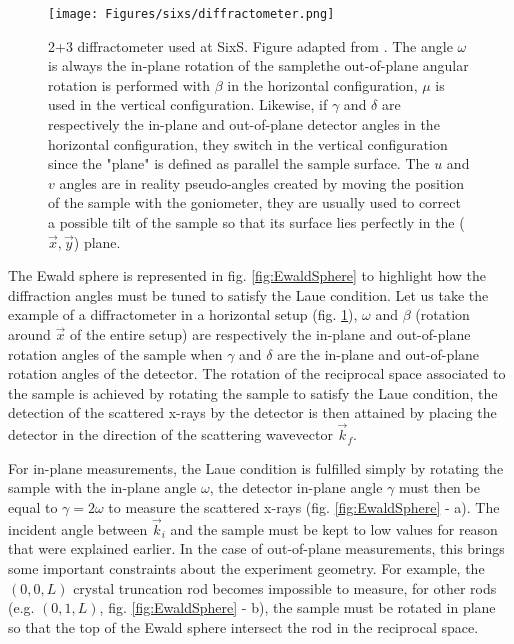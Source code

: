 \begin{figure}[!htb]
    \centering
    \texttt{[image: Figures/sixs/diffractometer.png]}
    \caption{
    2+3 diffractometer used at SixS. Figure adapted from \cite{Schleputz2011}.
    The angle $\omega$ is always the in-plane rotation of the samplethe out-of-plane angular rotation is performed with $\beta$ in the horizontal configuration, $\mu$ is used in the vertical configuration.
    Likewise, if $\gamma$ and $\delta$ are respectively the in-plane and out-of-plane detector angles in the horizontal configuration, they switch in the vertical configuration since the "plane" is defined as parallel the sample surface.
    The $u$ and $v$ angles are in reality pseudo-angles created by moving the position of the sample with the goniometer, they are usually used to correct a possible tilt of the sample so that its surface lies perfectly in the ($\vec{x}, \vec{y}$) plane.
    }
    \label{fig:Diffractometer}
\end{figure}

The Ewald sphere is represented in fig. \ref{fig:EwaldSphere} to highlight how the diffraction angles must be tuned to satisfy the Laue condition.
Let us take the example of a diffractometer in a horizontal setup (fig. \ref{fig:Diffractometer}), $\omega$ and $\beta$ (rotation around $\vec{x}$ of the entire setup) are respectively the in-plane and out-of-plane rotation angles of the sample when $\gamma$ and $\delta$ are the in-plane and out-of-plane rotation angles of the detector.
The rotation of the reciprocal space associated to the sample is achieved by rotating the sample to satisfy the Laue condition, the detection of the scattered x-rays by the detector is then attained by placing the detector in the direction of the scattering wavevector $\vec{k}_f$.

For in-plane measurements, the Laue condition is fulfilled simply by rotating the sample with the in-plane angle $\omega$, the detector in-plane angle $\gamma$ must then be equal to $\gamma = 2 \omega$ to measure the scattered x-rays (fig. \ref{fig:EwaldSphere} - a).
The incident angle between $\vec{k}_i$ and the sample must be kept to low values for reason that were explained earlier.
In the case of out-of-plane measurements, this brings some important constraints about the experiment geometry.
For example, the $(0, 0, L)$ crystal truncation rod becomes impossible to measure, for other rods (e.g. $(0, 1, L)$, fig. \ref{fig:EwaldSphere} - b), the sample must be rotated in plane so that the top of the Ewald sphere intersect the rod in the reciprocal space.


